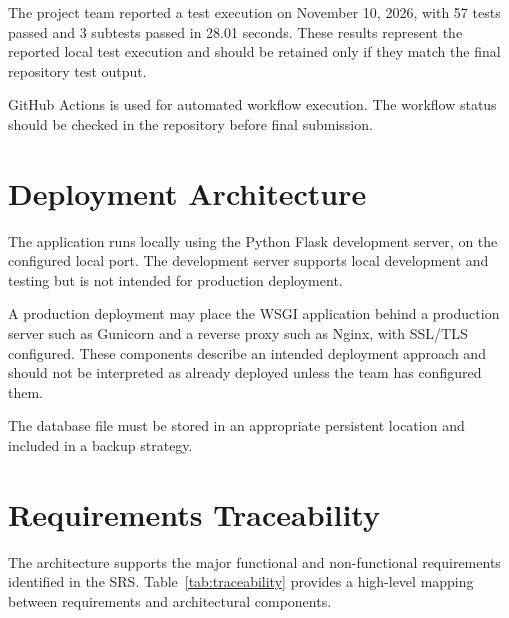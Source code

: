 \documentclass[conference]{IEEEtran}
\begin{document}
The project team reported a test execution on November 10, 2026, with 57 tests passed and 3 subtests passed in 28.01 seconds. These results represent the reported local test execution and should be retained only if they match the final repository test output.

GitHub Actions is used for automated workflow execution. The workflow status should be checked in the repository before final submission.

\section{Deployment Architecture}

The application runs locally using the Python Flask development server, on the configured local port. The development server supports local development and testing but is not intended for production deployment.

A production deployment may place the WSGI application behind a production server such as Gunicorn and a reverse proxy such as Nginx, with SSL/TLS configured. These components describe an intended deployment approach and should not be interpreted as already deployed unless the team has configured them.

The database file must be stored in an appropriate persistent location and included in a backup strategy.

\section{Requirements Traceability}

The architecture supports the major functional and non-functional requirements identified in the SRS. Table~\ref{tab:traceability} provides a high-level mapping between requirements and architectural components.
\end{document}
